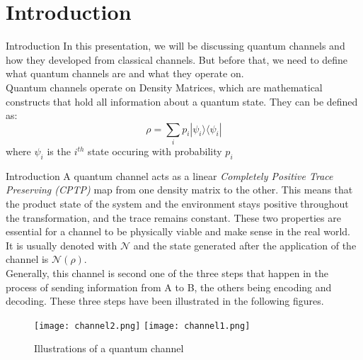 \section{Introduction}

\begin{frame}{Introduction}
    In this presentation, we will be discussing quantum channels and how they developed from classical channels. But before that, we need to define what quantum channels
    are and what they operate on. \\
    Quantum channels operate on Density Matrices, which are mathematical constructs that hold all information about a quantum state. They can be defined as:
    \begin{equation}
        \rho = \sum_{i}p_i | \psi_i \rangle \langle \psi_i |   
    \end{equation}
    where $\psi_i$ is the $i^{th}$ state occuring with probability $p_i$
\end{frame}

\begin{frame}{Introduction}
    A quantum channel acts as a linear \textit{Completely Positive Trace Preserving (CPTP)} map from one density matrix to the other. This means that the product state
    of the system and the environment stays positive throughout the transformation, and the trace remains constant. These two properties are essential for a channel to
    be physically viable and make sense in the real world.\\
    It is usually denoted with $\mathcal{N}$ and the state generated after the application of the channel is $\mathcal{N} (\rho)$.\\
    Generally, this channel is second one of the three steps that happen in the process of sending information from A to B, the others being encoding and decoding.
    These three steps have been illustrated in the following figures.
\end{frame}

\begin{frame}
    \begin{figure}
        \texttt{[image: channel2.png]}
        \texttt{[image: channel1.png]}
        \caption{Illustrations of a quantum channel}
    \end{figure}
    
\end{frame}

